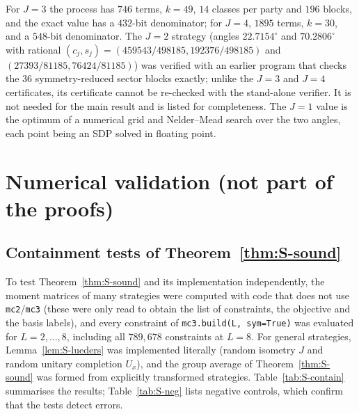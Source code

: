 \documentclass[aps,pra,onecolumn,notitlepage,superscriptaddress,longbibliography,nofootinbib,11pt]{revtex4-2}
\theoremstyle{remark}
\newcommand{\file}[1]{\texttt{#1}}
\begin{document}
For $J=3$ the process has $746$ terms, $k=49$, $14$ classes per party and $196$ blocks, and the exact value has a $432$-bit denominator; for $J=4$, $1895$ terms, $k=30$, and a $548$-bit denominator. The $J=2$ strategy (angles $22.7154^\circ$ and $70.2806^\circ$ with rational $(c_j,s_j)=(459543/498185,192376/498185)$ and $(27393/81185,76424/81185)$) was verified with an earlier program that checks the $36$ symmetry-reduced sector blocks exactly; unlike the $J=3$ and $J=4$ certificates, its certificate cannot be re-checked with the stand-alone verifier. It is not needed for the main result and is listed for completeness. The $J=1$ value is the optimum of a numerical grid and Nelder--Mead search over the two angles, each point being an SDP solved in floating point.

\section{Numerical validation (not part of the proofs)}\label{sec:numerics}

\subsection{Containment tests of Theorem~\ref{thm:S-sound}}

To test Theorem~\ref{thm:S-sound} and its implementation independently, the moment matrices of many strategies were computed with code that does not use \file{mc2}/\file{mc3} (these were only read to obtain the list of constraints, the objective and the basis labels), and every constraint of \file{mc3.build(L, sym=True)} was evaluated for $L=2,\dots,8$, including all $789{,}678$ constraints at $L=8$. For general strategies, Lemma~\ref{lem:S-lueders} was implemented literally (random isometry $J$ and random unitary completion $U_x$), and the group average of Theorem~\ref{thm:S-sound} was formed from explicitly transformed strategies. Table~\ref{tab:S-contain} summarises the results; Table~\ref{tab:S-neg} lists negative controls, which confirm that the tests detect errors.
\end{document}
